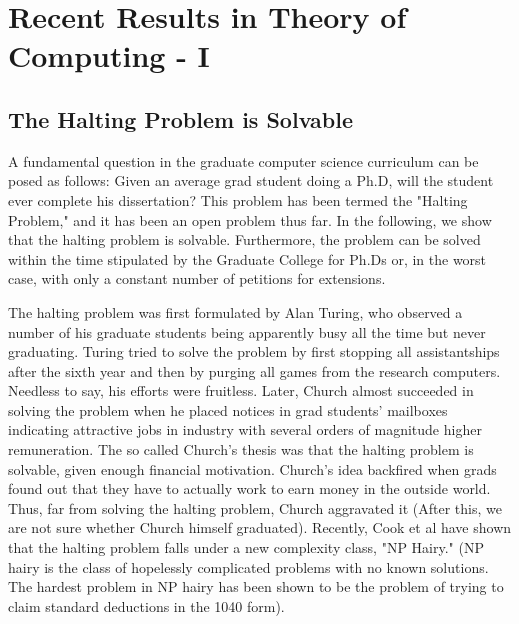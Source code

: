 \chapter{Recent Results in Theory of Computing - I}
\label{Recent Results in Theory of Computing - I}

\section{The Halting Problem is Solvable}

A fundamental question in the graduate computer science curriculum can be posed as follows: Given an average grad student doing a Ph.D, will the student ever complete his dissertation? This problem has been termed the "Halting Problem," and it has been an open problem thus far. In the following, we show that the halting problem is solvable. Furthermore, the problem can be solved within the time stipulated by the Graduate College for Ph.Ds or, in the worst case, with only a constant number of petitions for extensions.

The halting problem was first formulated by Alan Turing, who observed a number of his graduate students being apparently busy all the time but never graduating. Turing tried to solve the problem by first stopping all assistantships after the sixth year and then by purging all games from the research computers. Needless to say, his efforts were fruitless. Later, Church almost succeeded in solving the problem when he placed notices in grad students' mailboxes indicating attractive jobs in industry with several orders of magnitude higher remuneration. The so called Church's thesis was that the halting problem is solvable, given enough financial motivation. Church's idea backfired when grads found out that they have to actually work to earn money in the outside world. Thus, far from solving the halting problem, Church aggravated it (After this, we are not sure whether Church himself graduated). Recently, Cook et al have shown that the halting problem falls under a new complexity class, "NP Hairy." (NP hairy is the class of hopelessly complicated problems with no known solutions. The hardest problem in NP hairy has been shown to be the problem of trying to claim standard deductions in the 1040 form).

